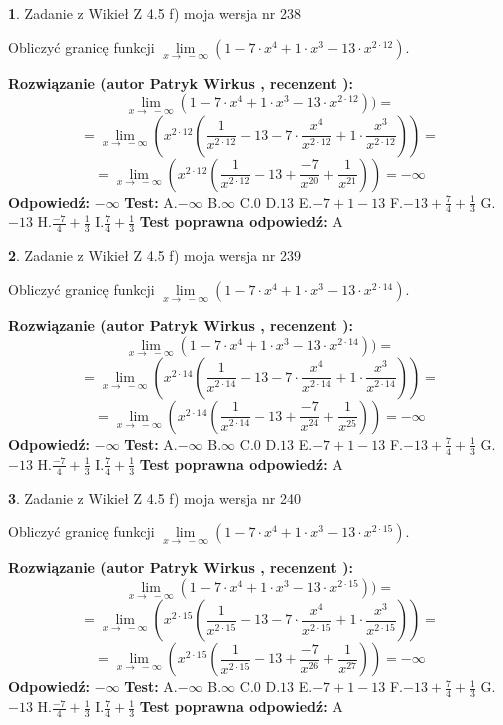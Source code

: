 \documentclass[12pt, a4paper]{article}
\theoremstyle{definition} %
\newtheorem{zad}{}
\newcommand{\zadStart}[1]{\begin{zad}#1\newline}
\newcommand{\zadStop}{\end{zad}}
\newcommand{\rozwStart}[2]{\noindent \textbf{Rozwiązanie (autor #1 , recenzent #2): }\newline}
\newcommand{\rozwStop}{\newline}
\newcommand{\odpStart}{\noindent \textbf{Odpowiedź:}\newline}
\newcommand{\odpStop}{\newline}
\newcommand{\testStart}{\noindent \textbf{Test:}\newline}
\newcommand{\testStop}{\newline}
\newcommand{\kluczStart}{\noindent \textbf{Test poprawna odpowiedź:}\newline}
\newcommand{\kluczStop}{\newline}
\begin{document}
\zadStart{Zadanie z Wikieł Z 4.5 f) moja wersja nr 238}



Obliczyć granicę funkcji  $\lim\limits_{x\to\ -\infty}(1 - 7 \cdot x^{4}+1 \cdot x^{3}- 13 \cdot x^{2\cdot12})$.
\zadStop
\rozwStart{Patryk Wirkus}{}
$$\lim\limits_{x\to\ -\infty}(1 - 7 \cdot x^{4}+1 \cdot x^{3}- 13 \cdot x^{2\cdot12}))=$$
$$=\lim\limits_{x\to\ -\infty}(x^{2\cdot12}(\frac{1}{x^{2\cdot12}}-13 -7 \cdot \frac{x^{4}}{x^{2\cdot12}}+1 \cdot \frac{x^{3}}{x^{2\cdot12}}))=$$
$$=\lim\limits_{x\to\ -\infty}(x^{2\cdot12}(\frac{1}{x^{2\cdot12}}-13 + \frac{-7}{x^{20}}+ \frac{1}{x^{21}}))=-\infty$$
\rozwStop
\odpStart
$-\infty$
\odpStop
\testStart
A.$-\infty$ B.$\infty$ C.$0$ D.$13$ E.$-7 + 1 - 13$
F.$-13+\frac{7}{4}+\frac{1}{3}$ G.$-13$
H.$\frac{-7}{4}+\frac{1}{3}$
I.$\frac{7}{4}+\frac{1}{3}$
\testStop
\kluczStart
A
\kluczStop



\zadStart{Zadanie z Wikieł Z 4.5 f) moja wersja nr 239}



Obliczyć granicę funkcji  $\lim\limits_{x\to\ -\infty}(1 - 7 \cdot x^{4}+1 \cdot x^{3}- 13 \cdot x^{2\cdot14})$.
\zadStop
\rozwStart{Patryk Wirkus}{}
$$\lim\limits_{x\to\ -\infty}(1 - 7 \cdot x^{4}+1 \cdot x^{3}- 13 \cdot x^{2\cdot14}))=$$
$$=\lim\limits_{x\to\ -\infty}(x^{2\cdot14}(\frac{1}{x^{2\cdot14}}-13 -7 \cdot \frac{x^{4}}{x^{2\cdot14}}+1 \cdot \frac{x^{3}}{x^{2\cdot14}}))=$$
$$=\lim\limits_{x\to\ -\infty}(x^{2\cdot14}(\frac{1}{x^{2\cdot14}}-13 + \frac{-7}{x^{24}}+ \frac{1}{x^{25}}))=-\infty$$
\rozwStop
\odpStart
$-\infty$
\odpStop
\testStart
A.$-\infty$ B.$\infty$ C.$0$ D.$13$ E.$-7 + 1 - 13$
F.$-13+\frac{7}{4}+\frac{1}{3}$ G.$-13$
H.$\frac{-7}{4}+\frac{1}{3}$
I.$\frac{7}{4}+\frac{1}{3}$
\testStop
\kluczStart
A
\kluczStop



\zadStart{Zadanie z Wikieł Z 4.5 f) moja wersja nr 240}



Obliczyć granicę funkcji  $\lim\limits_{x\to\ -\infty}(1 - 7 \cdot x^{4}+1 \cdot x^{3}- 13 \cdot x^{2\cdot15})$.
\zadStop
\rozwStart{Patryk Wirkus}{}
$$\lim\limits_{x\to\ -\infty}(1 - 7 \cdot x^{4}+1 \cdot x^{3}- 13 \cdot x^{2\cdot15}))=$$
$$=\lim\limits_{x\to\ -\infty}(x^{2\cdot15}(\frac{1}{x^{2\cdot15}}-13 -7 \cdot \frac{x^{4}}{x^{2\cdot15}}+1 \cdot \frac{x^{3}}{x^{2\cdot15}}))=$$
$$=\lim\limits_{x\to\ -\infty}(x^{2\cdot15}(\frac{1}{x^{2\cdot15}}-13 + \frac{-7}{x^{26}}+ \frac{1}{x^{27}}))=-\infty$$
\rozwStop
\odpStart
$-\infty$
\odpStop
\testStart
A.$-\infty$ B.$\infty$ C.$0$ D.$13$ E.$-7 + 1 - 13$
F.$-13+\frac{7}{4}+\frac{1}{3}$ G.$-13$
H.$\frac{-7}{4}+\frac{1}{3}$
I.$\frac{7}{4}+\frac{1}{3}$
\testStop
\kluczStart
A
\kluczStop
\end{document}
